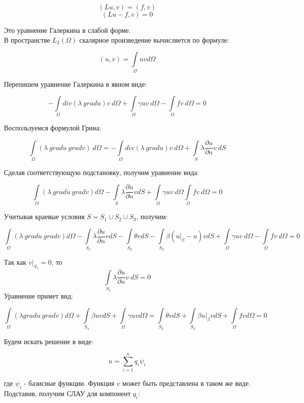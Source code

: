 \documentclass[12pt,a4paper]{article}
\begin{document}
\[ (Lu, v) = (f, v) \]
\[ (Lu - f, v) = 0 \]

\noindent Это уравнение Галеркина в слабой форме. \\
В пространстве $L_2(\Omega)$ скалярное произведение
вычисляется по формуле:

\[ (u, v) = \int \limits_{\Omega} uv d\Omega \]

\noindent Перепишем уравнение Галеркина в явном виде:

\[
    -\int \limits_{\Omega} div(\lambda \ grad u) v \ d\Omega
    +\int \limits_{\Omega} \gamma u v \ d\Omega
    -\int \limits_{\Omega} fv \ d\Omega
    = 0
\]

\noindent Воспользуемся формулой Грина:

\[
    \int \limits_{\Omega} (\lambda \ grad u \ grad v) \ d\Omega
    = -\int \limits_{\Omega} div (\lambda \ grad u) v \ d\Omega
    + \int \limits_S \lambda \frac{\partial u}{\partial n} v \ dS
\]

\noindent Сделав соответствующую подстановку,
получим уравнение вида:

\[
    \int \limits_{\Omega} (\lambda \ grad u \ grad v) d\Omega
    - \int \limits_S \lambda \frac{\partial u}{\partial n} v dS
    + \int \limits_{\Omega} \gamma u v \ d\Omega
    \int \limits_{\Omega} f v \ d\Omega
    = 0
\]

\noindent Учитывая краевые условия  $S=S_1 \cup S_2 \cup S_3$, получим:

\[
    \int \limits_{\Omega} (\lambda \ grad u \ grad v) d\Omega
    - \int \limits_{S_1} \lambda \frac{\partial u}{\partial n} v dS
    - \int \limits_{S_2} \theta v dS
    - \int \limits_{S_3} \beta(u \vert_{\beta} - u) v dS
    + \int \limits_{\Omega} \gamma u v \ d\Omega
    - \int \limits_{\Omega} f v \ d\Omega
    = 0
\]

\noindent Так как $v \vert_{S_1} = 0$, то
\[
    \int \limits_{S_1} \lambda \frac{\partial u}{\partial n} v \ dS = 0
\]
\noindent Уравнение примет вид:

\[
    \int \limits_{\Omega} (\lambda grad u \ grad v) d\Omega
    + \int \limits_{S_3} \beta u v dS
    + \int \limits_{\Omega} \gamma u v d\Omega
    =
    \int \limits_{S_2} \theta v dS
    + \int \limits_{S_3} \beta u \vert_{\beta} v dS
    + \int \limits_{\Omega} f v d\Omega
    = 0
\]

\noindent Будем искать решение в виде:

\[
    u = \sum \limits_{i=1}^n q_i \psi_i
\]

\noindent где $\psi_i$ - базисные функции. Функция $v$ может
быть представлена в таком же виде. Подставив, получим СЛАУ
для компонент $q_i$:
\end{document}
